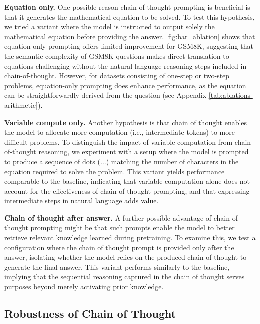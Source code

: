 \textbf{Equation only.} One possible reason chain-of-thought prompting is beneficial is that it generates the mathematical equation to be solved. To test this hypothesis, we tried a variant where the model is instructed to output solely the mathematical equation before providing the answer. \cref{fig:bar_ablation} shows that equation-only prompting offers limited improvement for GSM8K, suggesting that the semantic complexity of GSM8K questions makes direct translation to equations challenging without the natural language reasoning steps included in chain-of-thought. However, for datasets consisting of one-step or two-step problems, equation-only prompting does enhance performance, as the equation can be straightforwardly derived from the question (see Appendix \cref{tab:ablations-arithmetic}).


\textbf{Variable compute only.} Another hypothesis is that chain of thought enables the model to allocate more computation (i.e., intermediate tokens) to more difficult problems. To distinguish the impact of variable computation from chain-of-thought reasoning, we experiment with a setup where the model is prompted to produce a sequence of dots ($\ldots$) matching the number of characters in the equation required to solve the problem. This variant yields performance comparable to the baseline, indicating that variable computation alone does not account for the effectiveness of chain-of-thought prompting, and that expressing intermediate steps in natural language adds value.

\textbf{Chain of thought after answer.} A further possible advantage of chain-of-thought prompting might be that such prompts enable the model to better retrieve relevant knowledge learned during pretraining. To examine this, we test a configuration where the chain of thought prompt is provided only after the answer, isolating whether the model relies on the produced chain of thought to generate the final answer. This variant performs similarly to the baseline, implying that the sequential reasoning captured in the chain of thought serves purposes beyond merely activating prior knowledge.


\subsection{Robustness of Chain of Thought}\label{subsec:robustness}

